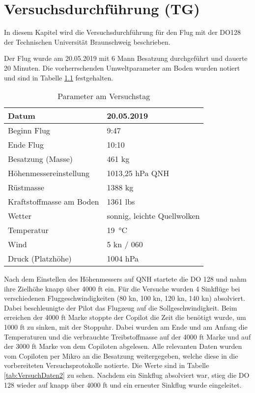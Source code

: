\chapter{Versuchsdurchführung (TG)}
\label{c:VdurchF}

In diesem Kapitel wird die Versuchsdurchführung für den Flug mit der DO128 der Technischen Universität Braunschweig beschrieben. 

Der Flug wurde am 20.05.2019 mit 6 Mann Besatzung durchgeführt und dauerte 20 Minuten. Die vorherrschenden Umweltparameter am Boden wurden notiert und sind in Tabelle \ref{tab:VersuchDaten1} festgehalten. 


\begin{table}[h]
	\centering
	\begin{tabular}{| l | l | }
\hline
	Datum  & 20.05.2019 \\ \hline
	Beginn Flug & 9:47 \\ \hline
	Ende Flug & 10:10 \\ \hline
	Besatzung (Masse) & 461 kg \\ \hline
	Höhenmessereinstellung & 1013,25 hPa QNH \\ \hline
	Rüstmasse & 1388 kg \\ \hline
	Kraftstoffmasse am Boden & 1361 lbs \\ \hline
	Wetter & sonnig, leichte Quellwolken \\ \hline
	Temperatur  & \SI{19}{\celsius} \\ \hline
	Wind & 5 kn / 060 \\ \hline
	Druck (Platzhöhe)  & 1004 hPa  \\ \hline
	\end{tabular}
	\caption{Parameter am Versuchstag}
	\label{tab:VersuchDaten1}
\end{table}

Nach dem Einstellen des Höhenmessers auf QNH startete die DO 128 und nahm ihre Zielhöhe knapp über 4000 ft ein. Für die Versuche wurden 4 Sinkflüge bei verschiedenen Fluggeschwindigkeiten (80 kn, 100 kn, 120 kn, 140 kn) absolviert. Dabei beschleunigte der Pilot das Flugzeug auf die Sollgeschwindigkeit. Beim erreichen der 4000 ft Marke stoppte der Copilot die Zeit die benötigt wurde, um 1000 ft zu sinken, mit der Stoppuhr. Dabei wurden am Ende und am Anfang die Temperaturen und die verbrauchte Treibstoffmasse auf der 4000 ft Marke und auf der 3000 ft Marke von dem Copiloten abgelesen. Alle relevanten Daten wurden vom Copiloten per Mikro an die Besatzung weitergegeben, welche diese in die vorbereiteten Versuchsprotokolle notierte. Die Werte sind in Tabelle \ref{tab:VersuchDaten2} zu sehen. Nachdem ein Sinkflug absolviert war, stieg die DO 128 wieder auf knapp über 4000 ft und ein erneuter Sinkflug wurde eingeleitet. 


